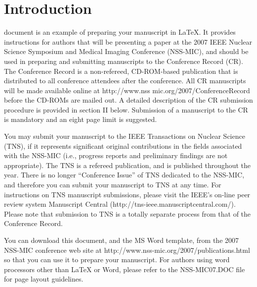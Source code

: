 \documentclass[journal]{IEEEtran}
\begin{document}


\section{Introduction}
% 
% 
% 
% 
 document is an example of preparing your manuscript in {\LaTeX}. It provides instructions for authors that will be presenting a paper at the 2007 IEEE Nuclear Science Symposium and Medical Imaging Conference (NSS-MIC), and should be used in preparing and submitting manuscripts to the Conference Record (CR). The Conference Record is a non-refereed, CD-ROM-based publication that is distributed to all conference attendees after the conference. All CR manuscripts will be made available online at http://www.nss mic.org/2007/ConferenceRecord before the CD-ROMs are mailed out. A detailed description of the CR submission procedure is provided in section II below. Submission of a manuscript to the CR is mandatory and an eight page limit is suggested.

You may submit your manuscript to the IEEE Transactions on Nuclear Science (TNS), if it represents significant original contributions in the fields associated with the NSS-MIC (i.e., progress reports and preliminary findings are not appropriate).  The TNS is a refereed publication, and is published throughout the year.  There is no longer ``Conference Issue'' of TNS dedicated to the NSS-MIC, and therefore you can submit your manuscript to TNS at any time. For instructions on TNS manuscript submissions, please visit the IEEE's on-line peer review system Manuscript Central (http://tns-ieee.manuscriptcentral.com/).  Please note that submission to TNS is a totally separate process from that of the Conference Record.

You can download this document, and the MS Word template, from the 2007 NSS-MIC conference web site at http://www.nss-mic.org/2007/publications.html so that you can use it to prepare your manuscript.  For authors using word processors other than {\LaTeX} or Word, please refer to the NSS-MIC07.DOC file for page layout guidelines. 
\end{document}
